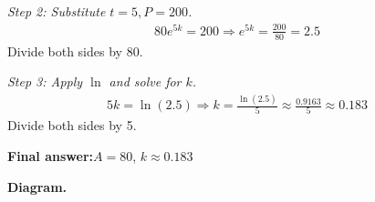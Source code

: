\documentclass[11pt]{article}
\begin{document}
\textit{Step 2: Substitute \( t = 5, P = 200 \).}
\[\begin{gathered}
80e^{5k} = 200 \Rightarrow e^{5k} = \frac{200}{80} = 2.5
\end{gathered}\]
Divide both sides by 80.

\textit{Step 3: Apply \( \ln \) and solve for \( k \).}
\[\begin{gathered}
5k = \ln(2.5) \Rightarrow k = \frac{\ln(2.5)}{5} \approx \frac{0.9163}{5} \approx 0.183
\end{gathered}\]
Divide both sides by 5.

\begin{answerbox}
\textbf{Final answer:}\quad \(\displaystyle  A = 80 \), \(\displaystyle  k \approx 0.183 \)
\end{answerbox}
\textbf{Diagram.}
\end{document}
